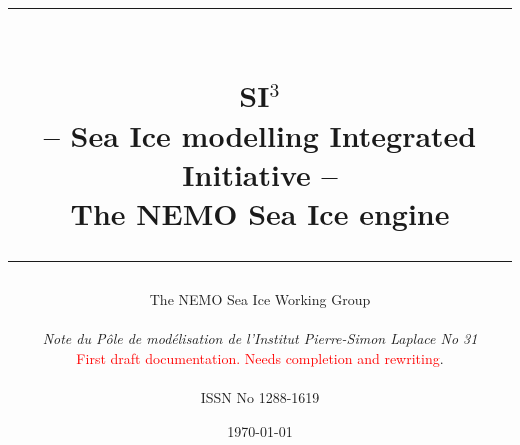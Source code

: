 \documentclass[a4paper, 11pt]{book}
\begin{document}


\title{
\vspace{1.5cm}
\rule{400pt}{1.5pt} \\
\vspace{0.45cm}
 {\Huge SI$^3$ \\}
 {\Large -- Sea Ice modelling Integrated Initiative --}\\
 {\Large The NEMO Sea Ice engine}\\ 
\date{\today}
\author{The NEMO Sea Ice Working Group \\
\\
\small \textit{Note du P\^ole de mod\'elisation de l'Institut Pierre-Simon Laplace No 31} \\
\small \textcolor{red}{First draft documentation. Needs completion and rewriting}. \\
\\
ISSN No 1288-1619\\
}
\rule{400pt}{1.5pt}
}

\maketitle						%

\frontmatter


\dominitoc
\tableofcontents



\mainmatter





















\end{document}
